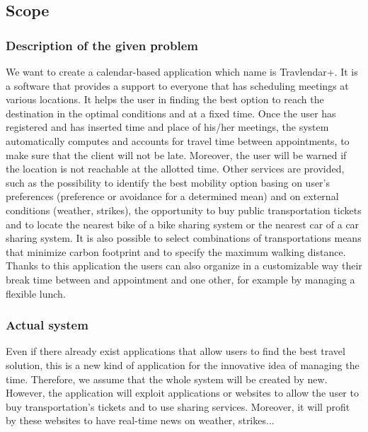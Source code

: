 \documentclass[12pt,titlepage]{article}
\begin{document}
\subsection{Scope}\label{RASD}
\subsubsection{Description of the given problem}\label{RASD}
We want to create a calendar-based application which name is Travlendar+. It is a software that provides a support to everyone that has scheduling meetings at various locations. It helps the user in finding the best option to reach the destination in the optimal conditions and at a fixed time. 
Once the user has registered and has inserted time and place of his/her meetings, the system automatically computes and accounts for travel time between appointments, to make sure that the client will not be late. Moreover, the user will be warned if the location is not reachable at the allotted time. Other services are provided, such as the possibility to identify the best mobility option basing on user's preferences (preference or avoidance for a determined mean) and on external conditions (weather, strikes), the opportunity to buy public transportation tickets and to locate the nearest bike of a bike sharing system or the nearest car of a car sharing system. It is also possible to select combinations of transportations means that minimize carbon footprint and to specify the maximum walking distance.
Thanks to this application the users can also organize in a customizable way their break time between and appointment and one other, for example by managing a flexible lunch. 

\subsubsection{Actual system}\label{RASD}
Even if there already exist applications that allow users to find the best travel solution, this is a new kind of application for the innovative idea of managing the time. Therefore, we assume that the whole system will be created by new.
However, the application will exploit applications or websites to allow the user to buy transportation's tickets and to use sharing services. Moreover, it will profit by these websites to have real-time news on weather, strikes...
\end{document}

